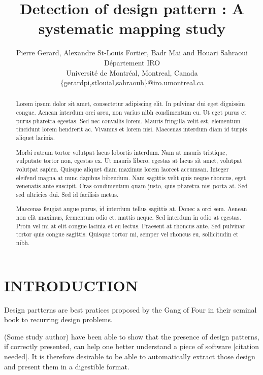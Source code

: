 \documentclass[letterpaper, 10 pt, conference]{ieeeconf}  %
\title{\LARGE \bf
Detection of design pattern : A systematic mapping study}
\author{Pierre Gerard, Alexandre St-Louis Fortier, Badr Mai and Houari Sahraoui \\
Département IRO \\
Université de Montréal, Montreal, Canada \\
\{gerardpi,stlouial,sahraouh\}@iro.umontreal.ca
}
\begin{document}
\maketitle
\thispagestyle{empty}
\pagestyle{empty}


\begin{abstract}



Lorem ipsum dolor sit amet, consectetur adipiscing elit. In pulvinar dui eget dignissim congue. Aenean interdum orci arcu, non varius nibh condimentum eu. Ut eget purus et purus pharetra egestas. Sed nec convallis lorem. Mauris fringilla velit est, elementum tincidunt lorem hendrerit ac. Vivamus et lorem nisi. Maecenas interdum diam id turpis aliquet lacinia.

Morbi rutrum tortor volutpat lacus lobortis interdum. Nam at mauris tristique, vulputate tortor non, egestas ex. Ut mauris libero, egestas at lacus sit amet, volutpat volutpat sapien. Quisque aliquet diam maximus lorem laoreet accumsan. Integer eleifend magna at nunc dapibus bibendum. Nam sagittis velit quis neque rhoncus, eget venenatis ante suscipit. Cras condimentum quam justo, quis pharetra nisi porta at. Sed sed ultricies dui. Sed id facilisis metus.

Maecenas feugiat augue purus, id interdum tellus sagittis at. Donec a orci sem. Aenean non elit maximus, fermentum odio et, mattis neque. Sed interdum in odio at egestas. Proin vel mi at elit congue lacinia et eu lectus. Praesent at rhoncus ante. Sed pulvinar tortor quis congue sagittis. Quisque tortor mi, semper vel rhoncus eu, sollicitudin et nibh.

\end{abstract}


\section{INTRODUCTION}


Design partterns are best pratices proposed by the Gang of Four in their seminal
book to recurring design problems.

(Some study author) have been able to show that the presence of design patterns,
if correctly presented, can help one better understand a piece of software
[citation needed].
It is therefore desirable to be able to automatically extract those design
and present them in a digestible format.
\end{document}
